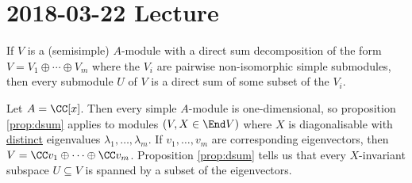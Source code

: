 \section{2018-03-22 Lecture}

\begin{prop}\label{prop:dsum}
	If $V$ is a (semisimple) $A$-module with a direct sum decomposition of the form $V = V_1 \oplus \cdots \oplus V_m$ where the $V_i$ are pairwise non-isomorphic simple submodules, then every submodule $U$ of $V$ is a direct sum of some subset of the $V_i$.
\end{prop}

\begin{cor}
	Let $A = \CC[x]$.
	Then every simple $A$-module is one-dimensional, so proposition \ref{prop:dsum} applies to modules $(V,X \in \End V)$ where $X$ is diagonalisable with \underline{distinct} eigenvalues $\lambda_1,\ldots,\lambda_m$.
	If $v_1,\ldots,v_m$ are corresponding eigenvectors, then $V = \CC v_1 \oplus \cdots \oplus \CC v_m$.
	Proposition \ref{prop:dsum} tells us that every $X$-invariant subspace $U \subseteq V$ is spanned by a subset of the eigenvectors.
\end{cor}

